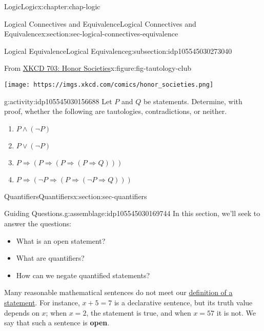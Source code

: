 \documentclass[oneside,10pt,]{book}
\newcommand{\terminology}[1]{\textbf{#1}}
\begin{document}
\begin{chapterptx}{Logic}{}{Logic}{}{}{x:chapter:chap-logic}
\begin{sectionptx}{Logical Connectives and Equivalence}{}{Logical Connectives and Equivalence}{}{}{x:section:sec-logical-connectives-equivalence}
\begin{subsectionptx}{Logical Equivalence}{}{Logical Equivalence}{}{}{g:subsection:idp105545030273040}
\begin{figureptx}{From \href{https://xkcd.com/703/}{XKCD 703: Honor Societies}\protect\footnotemark{}}{x:figure:fig-tautology-club}{}
\begin{image}{0.125}{0.75}{0.125}%
\texttt{[image: https://imgs.xkcd.com/comics/honor\_societies.png]}
\end{image}%
\tcblower
\end{figureptx}%
%
\begin{activity}{}{g:activity:idp105545030156688}%
Let \(P\) and \(Q\) be statements. Determine, with proof, whether the following are tautologies, contradictions, or neither.%
%
\begin{enumerate}
\item{}\(\displaystyle P\land (\neg P)\)%
\item{}\(\displaystyle P\lor (\neg P)\)%
\item{}\(\displaystyle P\Rightarrow (P\Rightarrow (P\Rightarrow (P\Rightarrow Q)))\)%
\item{}\(\displaystyle P\Rightarrow (\neg P\Rightarrow (P\Rightarrow (\neg P\Rightarrow Q)))\)%
\end{enumerate}
\end{activity}%
\end{subsectionptx}
\end{sectionptx}
%
%
\typeout{************************************************}
\typeout{************************************************}
%
\begin{sectionptx}{Quantifiers}{}{Quantifiers}{}{}{x:section:sec-quantifiers}
\begin{assemblage}{Guiding Questions.}{g:assemblage:idp105545030169744}%
In this section, we'll seek to answer the questions: %
\begin{itemize}[label=\textbullet]
\item{}What is an open statement?%
\item{}What are quantifiers?%
\item{}How can we negate quantified statements?%
\end{itemize}
%
\end{assemblage}
\begin{introduction}{}%
Many reasonable mathematical sentences do not meet our \hyperref[x:definition:def-statement]{definition of a statement}. For instance, \(x + 5 = 7\) is a declarative sentence, but its truth value depends on \(x\); when \(x = 2\), the statement is true, and when \(x = 57\) it is not. We say that such a sentence is \terminology{open}.%
\end{introduction}%

\end{sectionptx}
\end{chapterptx}
\end{document}
